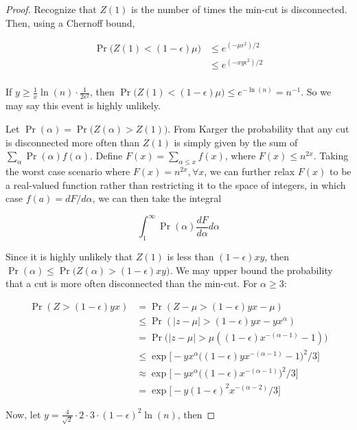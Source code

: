 \documentclass{article}
\begin{document}
\begin{proof}
Recognize that $Z(1)$ is the number of times the min-cut is disconnected. Then, using a Chernoff bound, 

\begin{align*}
\Pr \bigg(Z(1) < (1-\epsilon) \mu \bigg) &\leq e^{(-\mu \epsilon^2)/2} \\
&\leq e^{(-xy \epsilon^2)/2} \\
\end{align*}

If $y \geq \frac{1}{x} \ln(n) \cdot \frac{1}{2\epsilon^2}$, then $\Pr \bigg(Z(1) < (1-\epsilon)\mu \bigg) \leq e^{-\ln(n)} = n^{-1}$. So we may say this event is highly unlikely. 

Let $\Pr(\alpha) = \Pr \bigg( Z(\alpha) > Z(1) \bigg)$. From Karger\cite{Karger} the probability that any cut is disconnected more often than $Z(1)$ is simply given by the sum of $\sum_{\alpha} \Pr(\alpha) f(\alpha)$. Define $F(x) = \sum_{\alpha \leq x} f(x)$, where $F(x) \leq n^{2x}$. Taking the worst case scenario where $F(x) = n^{2x}, \forall x$, we can further relax $F(x)$ to be a real-valued function rather than restricting it to the space of integers, in which case $f(a) = dF/d\alpha$, we can then take the integral

\[
\int_{1}^\infty \Pr(\alpha) \frac{dF}{d\alpha} d\alpha
\]

Since it is highly unlikely that $Z(1)$ is less than $(1-\epsilon)xy$, then $\Pr(\alpha) \leq \Pr \bigg(Z(\alpha) > (1-\epsilon)xy \bigg)$. We may upper bound the probability that a cut is more often disconnected than the min-cut. For $\alpha \geq 3$:

\begin{align*}
\Pr(Z > (1 - \epsilon)yx) &= \Pr(Z - \mu > (1 - \epsilon)yx - \mu) \\
&\leq \Pr(|z-\mu| > (1-\epsilon)yx - yx^\alpha) \\
&= \Pr \bigg(|z-\mu| > \mu ((1-\epsilon) x^{-(\alpha-1)}-1)\bigg) \\
&\leq \exp \bigg[-yx^\alpha \bigg((1-\epsilon)yx^{-(\alpha-1)}-1\bigg)^2/3\bigg] \\
&\approx \exp \bigg[-yx^\alpha \bigg((1-\epsilon)x^{-(\alpha - 1)}\bigg)^2/3\bigg] \\
&= \exp \bigg[-y (1-\epsilon)^2 x^{-(\alpha-2)}/3\bigg]
\end{align*}

Now, let $y = \frac{4}{\sqrt{2}} \cdot 2 \cdot 3 \cdot (1-\epsilon)^2 \ln{(n)}$, then


\end{proof}
\end{document}

